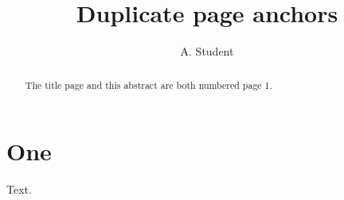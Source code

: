 \documentclass{report}
\title{Duplicate page anchors}
\author{A. Student}
\begin{document}
\maketitle
\begin{abstract}
The title page and this abstract are both numbered page 1.
\end{abstract}
\tableofcontents
\chapter{One}
Text.
\end{document}
